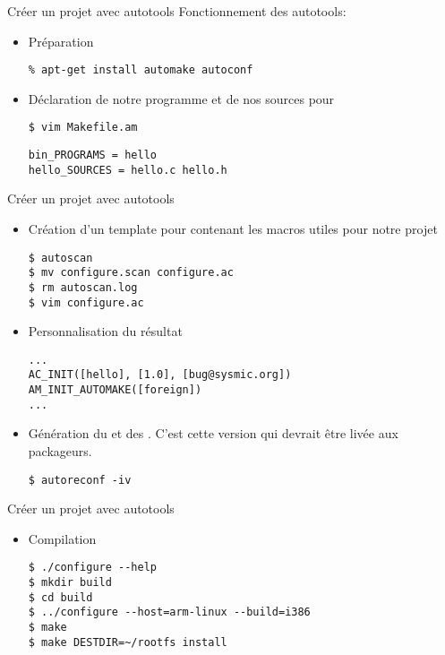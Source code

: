 \begin{frame}[fragile=singleslide]{Créer un projet avec autotools}
  Fonctionnement des autotools:
  \begin{itemize}
  \item Préparation
\begin{lstlisting}
% apt-get install automake autoconf
\end{lstlisting}
  \item Déclaration de notre programme et de nos sources pour 
\begin{lstlisting}
$ vim Makefile.am
\end{lstlisting} %
\begin{lstlisting}
bin_PROGRAMS = hello
hello_SOURCES = hello.c hello.h
\end{lstlisting}
  \end{itemize}
\end{frame}

\begin{frame}[fragile=singleslide]{Créer un projet avec autotools}
  \begin{itemize}
  \item  Création  d'un  template  pour   contenant  les
    macros utiles pour notre projet
\begin{lstlisting}
$ autoscan
$ mv configure.scan configure.ac
$ rm autoscan.log
$ vim configure.ac
\end{lstlisting}
  \item Personnalisation du résultat
\begin{lstlisting}
...
AC_INIT([hello], [1.0], [bug@sysmic.org])
AM_INIT_AUTOMAKE([foreign])
...
\end{lstlisting}
  \item      Génération      du            et      des
    . C'est cette version qui devrait être livée aux
    packageurs.
\begin{lstlisting}
$ autoreconf -iv
\end{lstlisting} %
  \end{itemize}
\end{frame}

\begin{frame}[fragile=singleslide]{Créer un projet avec autotools}
  \begin{itemize}
  \item Compilation
\begin{lstlisting}
$ ./configure --help
$ mkdir build
$ cd build
$ ../configure --host=arm-linux --build=i386
$ make
$ make DESTDIR=~/rootfs install
\end{lstlisting} %
  \end{itemize}
\end{frame}

